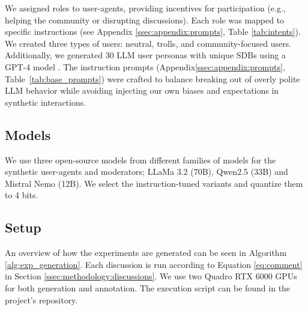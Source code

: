 We assigned roles to user-agents, providing incentives for participation (e.g., helping the community or disrupting discussions). Each role was mapped to specific instructions (see Appendix \ref{ssec:appendix:prompts}, Table \ref{tab:intents}). We created three types of users: neutral, trolls, and community-focused users. Additionally, we generated 30 \ac{LLM} user personas with unique \acp{SDB} using a GPT-4 model \cite{openai2024gpt4technicalreport}. The instruction prompts (Appendix\ref{ssec:appendix:prompts}, Table~\ref{tab:base_prompts}) were crafted to balance breaking out of overly polite \ac{LLM} behavior while avoiding injecting our own biases and expectations in synthetic interactions.


\subsection{Models}
\label{ssec:experimental:model}

We use three open-source models from different families of models for the synthetic user-agents and moderators; LLaMa 3.2 (70B), Qwen2.5 (33B) and Mistral Nemo (12B). We select the instruction-tuned variants and quantize them to 4 bits.


\subsection{Setup}

An overview of how the experiments are generated can be seen in Algorithm \ref{alg:exp_generation}. Each discussion is run according to Equation \ref{eq:comment} in Section \ref{ssec:methodology:discussions}. We use two Quadro RTX 6000 GPUs for both generation and annotation. The execution script can be found in the project's repository\analysislink.

